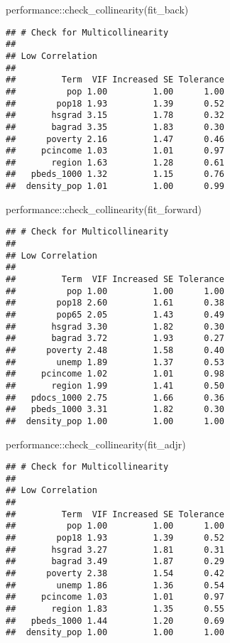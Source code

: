 \documentclass[
]{article}
\newenvironment{Shaded}{\begin{snugshade}}{\end{snugshade}}
\newcommand{\FunctionTok}[1]{\textcolor[rgb]{0.00,0.00,0.00}{#1}}
\newcommand{\NormalTok}[1]{#1}
\newcommand{\SpecialCharTok}[1]{\textcolor[rgb]{0.00,0.00,0.00}{#1}}
\begin{document}
\begin{Shaded}
\begin{Highlighting}[]
\NormalTok{performance}\SpecialCharTok{::}\FunctionTok{check\_collinearity}\NormalTok{(fit\_back)}
\end{Highlighting}
\end{Shaded}

\begin{verbatim}
## # Check for Multicollinearity
## 
## Low Correlation
## 
##         Term  VIF Increased SE Tolerance
##          pop 1.00         1.00      1.00
##        pop18 1.93         1.39      0.52
##       hsgrad 3.15         1.78      0.32
##       bagrad 3.35         1.83      0.30
##      poverty 2.16         1.47      0.46
##     pcincome 1.03         1.01      0.97
##       region 1.63         1.28      0.61
##   pbeds_1000 1.32         1.15      0.76
##  density_pop 1.01         1.00      0.99
\end{verbatim}

\begin{Shaded}
\begin{Highlighting}[]
\NormalTok{performance}\SpecialCharTok{::}\FunctionTok{check\_collinearity}\NormalTok{(fit\_forward)}
\end{Highlighting}
\end{Shaded}

\begin{verbatim}
## # Check for Multicollinearity
## 
## Low Correlation
## 
##         Term  VIF Increased SE Tolerance
##          pop 1.00         1.00      1.00
##        pop18 2.60         1.61      0.38
##        pop65 2.05         1.43      0.49
##       hsgrad 3.30         1.82      0.30
##       bagrad 3.72         1.93      0.27
##      poverty 2.48         1.58      0.40
##        unemp 1.89         1.37      0.53
##     pcincome 1.02         1.01      0.98
##       region 1.99         1.41      0.50
##   pdocs_1000 2.75         1.66      0.36
##   pbeds_1000 3.31         1.82      0.30
##  density_pop 1.00         1.00      1.00
\end{verbatim}

\begin{Shaded}
\begin{Highlighting}[]
\NormalTok{performance}\SpecialCharTok{::}\FunctionTok{check\_collinearity}\NormalTok{(fit\_adjr)}
\end{Highlighting}
\end{Shaded}

\begin{verbatim}
## # Check for Multicollinearity
## 
## Low Correlation
## 
##         Term  VIF Increased SE Tolerance
##          pop 1.00         1.00      1.00
##        pop18 1.93         1.39      0.52
##       hsgrad 3.27         1.81      0.31
##       bagrad 3.49         1.87      0.29
##      poverty 2.38         1.54      0.42
##        unemp 1.86         1.36      0.54
##     pcincome 1.03         1.01      0.97
##       region 1.83         1.35      0.55
##   pbeds_1000 1.44         1.20      0.69
##  density_pop 1.00         1.00      1.00
\end{verbatim}
\end{document}
